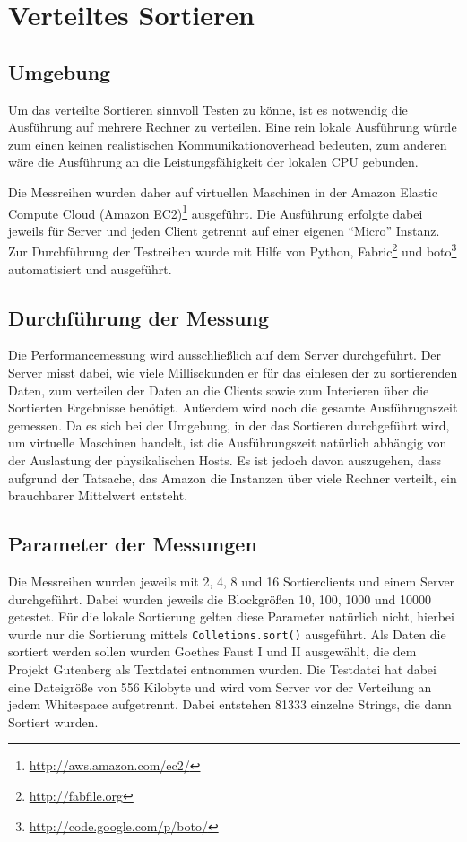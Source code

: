 \documentclass[fontsize=12pt,a4paper,headinclude=no,headings=small]{scrartcl}
\newcommand{\footurl}[1]{\footnote{\url{#1}}}
\begin{document}
\section{Verteiltes Sortieren}
\subsection{Umgebung}
Um das verteilte Sortieren sinnvoll Testen zu könne, ist es notwendig die Ausführung auf mehrere Rechner zu verteilen. Eine rein lokale Ausführung würde zum einen keinen realistischen Kommunikationoverhead bedeuten, zum anderen wäre die Ausführung an die Leistungsfähigkeit der lokalen CPU gebunden.

Die Messreihen wurden daher auf virtuellen Maschinen in der Amazon Elastic Compute Cloud (Amazon EC2)\footurl{http://aws.amazon.com/ec2/} ausgeführt. Die Ausführung erfolgte dabei jeweils für Server und jeden Client getrennt auf einer eigenen "`Micro"' Instanz. Zur Durchführung der Testreihen wurde mit Hilfe von Python, Fabric\footurl{http://fabfile.org} und boto\footurl{http://code.google.com/p/boto/} automatisiert und ausgeführt.

\subsection{Durchführung der Messung}
Die Performancemessung wird ausschließlich auf dem Server durchgeführt. Der Server misst dabei, wie viele Millisekunden er für das einlesen der zu sortierenden Daten, zum verteilen der Daten an die Clients sowie zum Interieren über die Sortierten Ergebnisse benötigt. Außerdem wird noch die gesamte Ausführugnszeit gemessen. Da es sich bei der Umgebung, in der das Sortieren durchgeführt wird, um virtuelle Maschinen handelt, ist die Ausführungszeit natürlich abhängig von der Auslastung der physikalischen Hosts. Es ist jedoch davon auszugehen, dass aufgrund der Tatsache, das Amazon die Instanzen über viele Rechner verteilt, ein brauchbarer Mittelwert entsteht.

\subsection{Parameter der Messungen}
Die Messreihen wurden jeweils mit 2, 4, 8 und 16 Sortierclients und einem Server durchgeführt. Dabei wurden jeweils die Blockgrößen 10, 100, 1000 und 10000 getestet. Für die lokale Sortierung gelten diese Parameter natürlich nicht, hierbei wurde nur die Sortierung mittels \texttt{Colletions.sort()} ausgeführt. Als Daten die sortiert werden sollen wurden Goethes Faust I und II ausgewählt, die dem Projekt Gutenberg als Textdatei entnommen wurden. Die Testdatei hat dabei eine Dateigröße von 556 Kilobyte und wird vom Server vor der Verteilung an jedem Whitespace aufgetrennt. Dabei entstehen 81333 einzelne Strings, die dann Sortiert wurden.
\end{document}
